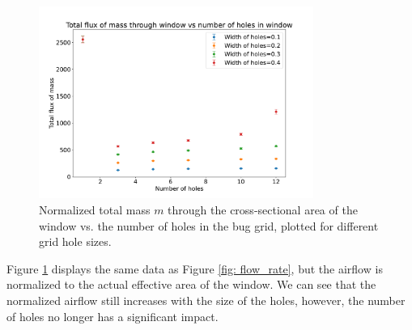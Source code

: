\begin{figure}[H]
    \centering
    \includegraphics[width=0.8\textwidth]{figures/flux_vs_holes_norm.pdf}
    \caption{Normalized total mass $m$ through the cross-sectional area of the window vs. the number of holes in the bug grid, plotted for different grid hole sizes.}
    \label{fig: flow_rate_norm}
\end{figure}
Figure \ref{fig: flow_rate_norm} displays the same data as Figure \ref{fig: flow_rate}, but the airflow is normalized to the actual effective area of the window. We can see that the normalized airflow still increases with the size of the holes, however, the number of holes no longer has a significant impact.


